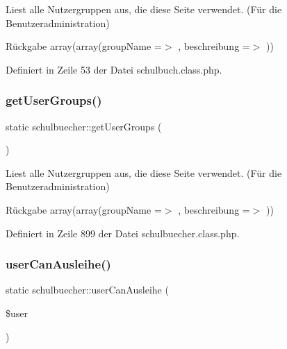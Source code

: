 Liest alle Nutzergruppen aus, die diese Seite verwendet. (Für die Benutzeradministration) \begin{DoxyReturn}{Rückgabe}
array(array(\textquotesingle{}group\+Name\textquotesingle{} =$>$ \textquotesingle{}\textquotesingle{}, \textquotesingle{}beschreibung\textquotesingle{} =$>$ \textquotesingle{}\textquotesingle{})) 
\end{DoxyReturn}


Definiert in Zeile 53 der Datei schulbuch.\+class.\+php.

\mbox{\label{classschulbuecher_aa28fac3077eadbd8c7aed5e26a263508}} 
\subsubsection{\texorpdfstring{get\+User\+Groups()}{getUserGroups()}\hspace{0.1cm}{\footnotesize\ttfamily [2/2]}}
{\footnotesize\ttfamily static schulbuecher\+::get\+User\+Groups (\begin{DoxyParamCaption}{ }\end{DoxyParamCaption})\hspace{0.3cm}{\ttfamily [static]}}

Liest alle Nutzergruppen aus, die diese Seite verwendet. (Für die Benutzeradministration) \begin{DoxyReturn}{Rückgabe}
array(array(\textquotesingle{}group\+Name\textquotesingle{} =$>$ \textquotesingle{}\textquotesingle{}, \textquotesingle{}beschreibung\textquotesingle{} =$>$ \textquotesingle{}\textquotesingle{})) 
\end{DoxyReturn}


Definiert in Zeile 899 der Datei schulbuecher.\+class.\+php.

\mbox{\label{classschulbuecher_adda60b34e8118f7fdef2ae3148ddfd93}} 
\subsubsection{\texorpdfstring{user\+Can\+Ausleihe()}{userCanAusleihe()}}
{\footnotesize\ttfamily static schulbuecher\+::user\+Can\+Ausleihe (\begin{DoxyParamCaption}\item[{}]{\$user }\end{DoxyParamCaption})\hspace{0.3cm}{\ttfamily [static]}}



